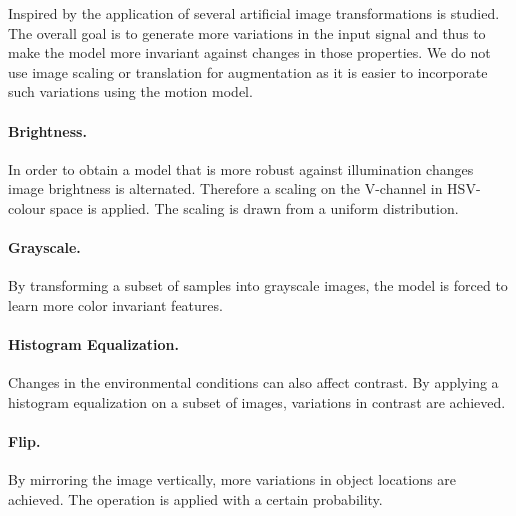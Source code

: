 Inspired by \cite{Howard2013, Redmon, Liu} the application of several artificial image transformations is studied. The overall goal is to generate more variations in the input signal and thus to make the model more invariant against changes in those properties. We do not use image scaling or translation for augmentation as it is easier to incorporate such variations using the motion model.

\paragraph{Brightness.} In order to obtain a model that is more robust against illumination changes image brightness is alternated. Therefore a scaling on the V-channel in HSV-colour space is applied. The scaling is drawn from a uniform distribution.
	
\paragraph{Grayscale.} By transforming a subset of samples into grayscale images, the model is forced to learn more color invariant features. 
	
\paragraph{Histogram Equalization.} Changes in the environmental conditions can also affect contrast. By applying a histogram equalization on a subset of images, variations in contrast are achieved. 
	
\paragraph{Flip.} By mirroring the image vertically, more variations in object locations are achieved. The operation is applied with a certain probability.


